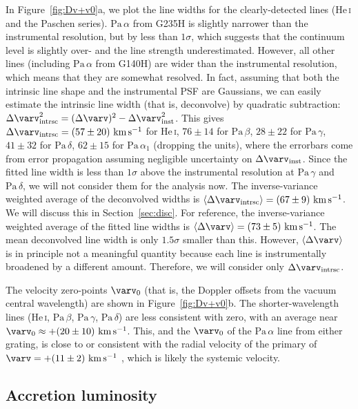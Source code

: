 \documentclass[twocolumn,twocolumnappendix]{aastex631}
\newcommand{\neuI}[1]{{\leavevmode{\boldmath\bfseries#1}}}
\renewcommand{\neuI}[1]{{\leavevmode#1}}
\def\Paa{\ensuremath{\mathrm{Pa}\,\alpha}\xspace}           %
\def\Pab{\ensuremath{\mathrm{Pa}\,\beta}\xspace}            %
\def\Pag{\ensuremath{\mathrm{Pa}\,\gamma}\xspace}           %
\def\Pad{\ensuremath{\mathrm{Pa}\,\delta}\xspace}           %
\def\HeI{\ensuremath{\mathrm{He}}\,\textsc{i}\xspace}       %
\def\HeIt{\HeI}                     %
\def\DvInst{\ensuremath{\Delta \varv_{\mathrm{inst}}}\xspace}
\def\Dvint{\ensuremath{\Delta \varv_{\mathrm{intrsc}}}\xspace}
\def\kms{\ensuremath{\textrm{km}\,\textrm{s}^{-1}}\xspace}    %
\begin{document}
In Figure~\ref{fig:Dv+v0}a, we plot the line widths for the clearly-detected lines (\HeIt and the Paschen series).
\Paa from G235H is slightly narrower than the instrumental resolution, but by less than $1\sigma$, which suggests that the continuum level is slightly over- and the line strength underestimated.
However, all other lines (including \Paa from G140H) are wider than the instrumental resolution, which means that they are somewhat resolved.
%
%
In fact, assuming that both the intrinsic line shape and the instrumental PSF are Gaussians, we can easily estimate the intrinsic line width (that is, deconvolve) by quadratic subtraction: $\Dvint^2 = (\Delta \varv)^2-\DvInst^2$.
%
%
%
%
%
%
%
%
%
%
%
%
%
%
%
%
%
%
%
%
%
%
%
This gives
$\Dvint=(57\pm20)~\kms$ for \HeIt,
$76\pm14$ for \Pab,
$28\pm22$ for \Pag,
$41\pm32$ for \Pad,
$62\pm15$ for $\Paa_1$ (dropping the units),
where the errorbars come from error propagation assuming negligible uncertainty on \DvInst.
%
Since the fitted line width is less than $1\sigma$ above the instrumental resolution at \Pag and \Pad, we will not consider them for the analysis now.
The inverse-variance weighted average of the deconvolved widths is
%
%
%
%
%
%
%
%
$\langle\Dvint\rangle=(67\pm9)~\kms$.
%
We will discuss this in Section~\ref{sec:disc}.
For reference, the inverse-variance weighted average of the fitted line widths is
%
%
%
%
%
$\langle\Delta \varv\rangle=(73\pm5)~\kms$.
The mean deconvolved line width is only $1.5\sigma$ smaller than this.
However, $\langle\Delta \varv\rangle$ is in principle not a meaningful quantity because each line is instrumentally broadened by a different amount. Therefore, we will consider only \Dvint.



The velocity zero-points \neuI{$\varv_0$ (that is, the Doppler offsets from the vacuum central wavelength)} are shown in Figure~\ref{fig:Dv+v0}b.
%
The \neuI{shorter}-wavelength lines (\HeIt, \Pab, \Pag, \Pad) are less consistent with zero, with an average near $\varv_0\approx+(20\pm10)~\kms$.  %
This, and the $\varv_0$ of the \Paa line from either grating, is close to or consistent with the radial velocity of the primary of $\varv=+(11\pm2)~\kms$ \citep{faherty16}, which is likely the systemic velocity.
%




%
%
%
%
%
%
%
%
%
%
%

%

\subsection{Accretion luminosity}
 \label{sec:Lacc}
\end{document}
